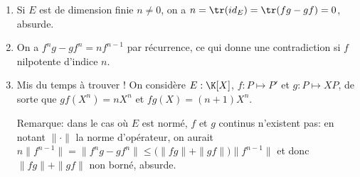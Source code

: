 \begin{enonce}
\begin{solution}
  \begin{enumerate}[\bfseries a)]
  \item Si $E$ est de dimension finie $n\neq 0$, on a
    $n=\tr(id_E)=\tr(fg-gf)=0$, absurde.
  \item On a $f^ng-gf^n=nf^{n-1}$ par récurrence, ce qui donne une
    contradiction si $f$ nilpotente d'indice $n$.
  \item Mis du temps à trouver ! On considère $E:\K[X]$, $f:P\mapsto
    P'$ et $g:P\mapsto XP$, de sorte que $gf(X^n)=nX^n$ et
    $fg(X)=(n+1)X^n$.
    
    Remarque: dans le cas où $E$ est normé, $f$ et $g$ continus
    n'existent pas: en notant $\|\cdot\|$ la norme d'opérateur, on aurait
    $n\|f^{n-1}\|=\|f^ng-gf^n\|\le \big(\|fg\|+\|gf\|\big)\|f^{n-1}\|$
    et donc $\|fg\|+\|gf\|$ non borné, absurde.
  \end{enumerate}
\end{solution}
\end{enonce}